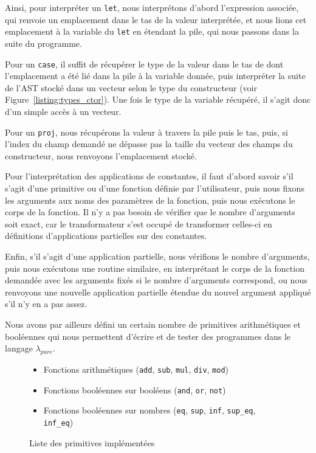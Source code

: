 \documentclass{rapportECL}
\begin{document}
\medskip

Ainsi, pour interpréter un \verb|let|, nous interprétons d'abord l'expression associée, qui renvoie un emplacement dans le tas
de la valeur interprétée, et nous lions cet emplacement à la variable du \verb|let| en étendant la pile, qui nous passons dans 
la suite du programme.

\medskip

Pour un \verb|case|, il suffit de récupérer le type de la valeur dans le tas de dont l'emplacement a été lié dans la pile à la variable 
donnée, puis interpréter la suite de l'AST stocké dans un vecteur selon le type du constructeur (voir Figure~\ref{listing:types_ctor}).
Une fois le type de la variable récupéré, il s'agit donc d'un simple accès à un vecteur.

\medskip

Pour un \verb|proj|, nous récupérons la valeur à travers la pile puis le tas, puis, si l'index du champ demandé ne dépasse pas la 
taille du vecteur des champs du constructeur, nous renvoyons l'emplacement stocké.

\medskip

Pour l'interprétation des applications de constantes, il faut d'abord savoir s'il s'agit d'une primitive ou d'une fonction 
définie par l'utilisateur, puis nous fixons les arguments aux noms des paramètres de la fonction, puis nous exécutons le corps de la fonction.
Il n'y a pas besoin de vérifier que le nombre d'arguments soit exact, car le transformateur s'est occupé de transformer celles-ci
en définitions d'applications partielles sur des constantes.

\medskip

Enfin, s'il s'agit d'une application partielle, nous vérifions le nombre d'arguments, puis nous exécutons une routine similaire,
en interprétant le corps de la fonction demandée avec les arguments fixés si le nombre d'arguments correspond, ou
nous renvoyons une nouvelle application partielle étendue du nouvel argument appliqué s'il n'y en a pas assez.

\bigskip

Nous avons par ailleurs défini un certain nombre de primitives arithmétiques et booléennes qui nous permettent d'écrire et 
de tester des programmes dans le langage $\lambda_{pure}$.

\begin{figure}[H]
	\begin{itemize}
		\item Fonctions arithmétiques (\verb|add|, \verb|sub|, \verb|mul|, \verb|div|, \verb|mod|)
		\item Fonctions booléennes sur booléens (\verb|and|, \verb|or|, \verb|not|)
		\item Fonctions booléennes sur nombres (\verb|eq|, \verb|sup|, \verb|inf|, \verb|sup_eq|, \verb|inf_eq|)
	\end{itemize}
	\label{primitives}
	\caption{Liste des primitives implémentées}
\end{figure}
\end{document}
